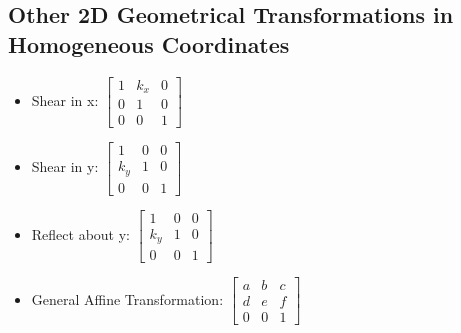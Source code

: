 \subsection{Other 2D Geometrical Transformations in Homogeneous Coordinates}
\begin{itemize}
    \item Shear in x: $ \left[\begin{array}{ccc} 1 & k_x & 0 \\ 0 & 1 & 0 \\ 0 & 0 & 1 \end{array}\right]$
    \item Shear in y: $ \left[\begin{array}{ccc} 1 & 0 & 0 \\ k_y & 1 & 0 \\ 0 & 0 & 1 \end{array}\right]$
    \item Reflect about y: $ \left[\begin{array}{ccc} 1 & 0 & 0 \\ k_y & 1 & 0 \\ 0 & 0 & 1 \end{array}\right]$
    \item General Affine Transformation: $ \left[\begin{array}{ccc} a & b & c \\ d & e & f \\ 0 & 0 & 1 \end{array}\right]$
\end{itemize}

